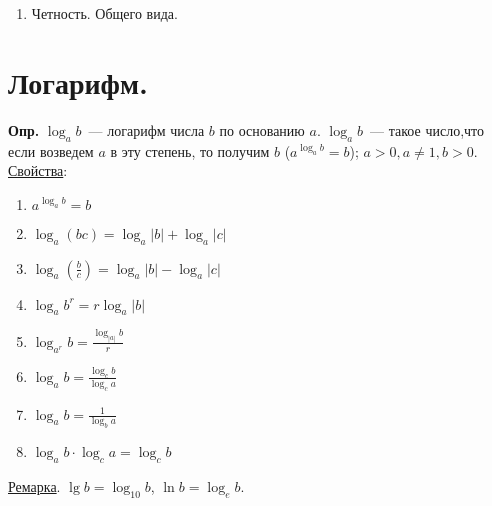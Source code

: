 \documentclass{article}
\begin{document}
\begin{enumerate}
\begin{itemize}
\begin{figure}[H]
			\end{figure}
		\end{itemize}
		\item Четность. Общего вида.
	\end{enumerate}
	\section{Логарифм.}
	\textbf{Опр.} $\log_ab$~--- логарифм числа $b$ по основанию $a$. $\log_ab$~--- такое число,что если возведем $a$ в эту степень, то получим $b$ ($a^{\log_ab} = b$); $a > 0, a\not=1, b > 0$. \\
	\underline{Свойства}:
	\begin{enumerate}
		\item $a^{\log_ab} = b$
		\item $\log_a(bc) = \log_a|b| + \log_a|c|$
		\item $\log_a(\frac{b}{c}) = \log_a|b| - \log_a|c|$
		\item $\log_ab^r = r\log_a|b|$
		\item $\log_{a^r}b = \frac{
		\log_{|a|}b}{r}$
		\item $\log_ab = \frac{\log_cb}{\log_ca}$
		\item $\log_ab = \frac{1}{\log_ba}$
		\item $\log_ab \cdot \log_ca = \log_cb$
	\end{enumerate}
	\underline{Ремарка}. $\lg b = \log_{10}b$, $\ln b = \log_{e}b$.
\end{document}
